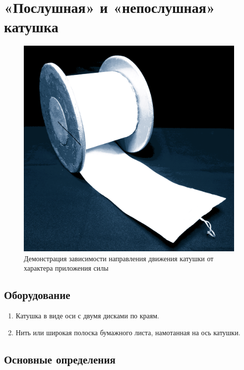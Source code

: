 \documentclass[All.tex]{subfiles}
\begin{document}


	\section{«Послушная» и  «непослушная» катушка}


\begin{figure}[H] 
	\centering 	
	\includegraphics[width=0.75\linewidth]{roll-1.png}
	\caption{Демонстрация зависимости направления движения катушки от характера приложения силы}
	\label{roll-1}
\end{figure}

\subsection*{\textcolor{PineGreen}{Оборудование}}

\begin{enumerate}
	\item Катушка в виде оси с двумя дисками по краям.
	\item Нить или широкая полоска бумажного листа, намотанная на ось катушки.
\end{enumerate}

\subsection*{\textcolor{PineGreen}{Основные определения}}
\end{document}
